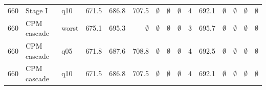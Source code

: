 \documentclass[11pt,a4paper]{article}
\begin{document}
\begin{longtable}{lllrrrrrrlrrrrr}
660 & Stage I & q10 & 671.5 & 686.8 & 707.5 & $\emptyset$ & $\emptyset$ & $\emptyset$ & 4 & 692.1 & $\emptyset$ & $\emptyset$ & $\emptyset$ & $\emptyset$ \\
660 & CPM cascade & worst & 675.1 & 695.3 & $\emptyset$ & $\emptyset$ & $\emptyset$ & $\emptyset$ & 3 & 695.7 & $\emptyset$ & $\emptyset$ & $\emptyset$ & $\emptyset$ \\
660 & CPM cascade & q05 & 671.8 & 687.6 & 708.8 & $\emptyset$ & $\emptyset$ & $\emptyset$ & 4 & 692.5 & $\emptyset$ & $\emptyset$ & $\emptyset$ & $\emptyset$ \\
660 & CPM cascade & q10 & 671.5 & 686.8 & 707.5 & $\emptyset$ & $\emptyset$ & $\emptyset$ & 4 & 692.1 & $\emptyset$ & $\emptyset$ & $\emptyset$ & $\emptyset$ \\
\end{longtable}
\endgroup
\end{document}
